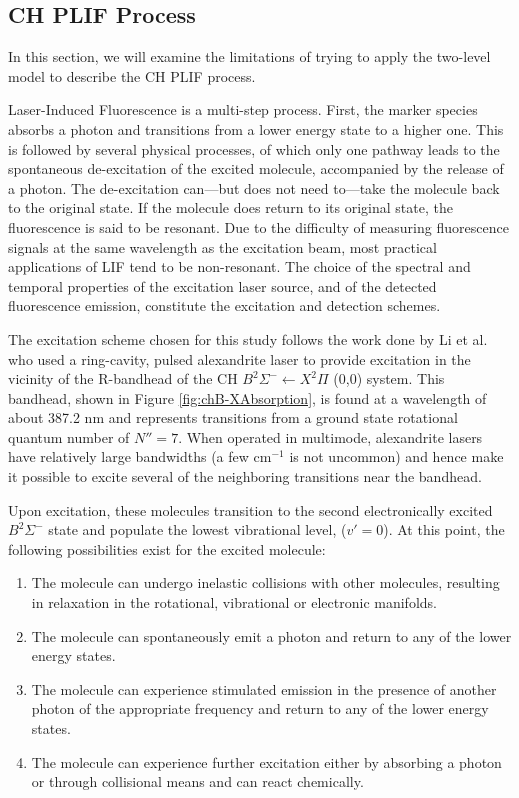 \subsection{CH PLIF Process}
\label{subsec:background-ch-plif-process}

In this section, we will examine the limitations of trying to apply the two-level model to describe the CH PLIF process.

Laser-Induced Fluorescence is a multi-step process.
First, the marker species absorbs a photon and transitions from a lower energy state to a higher one.
This is followed by several physical processes, of which only one pathway leads to the spontaneous de-excitation of the excited molecule, accompanied by the release of a photon.
The de-excitation can---but does not need to---take the molecule back to the original state.
If the molecule does return to its original state, the fluorescence is said to be resonant.
Due to the difficulty of measuring fluorescence signals at the same wavelength as the excitation beam, most practical applications of LIF tend to be non-resonant.
The choice of the spectral and temporal properties of the excitation laser source, and of the detected fluorescence emission, constitute the excitation and detection schemes.

The excitation scheme chosen for this study follows the work done by Li et al.\cite{2007-li-a} who used a ring-cavity, pulsed alexandrite laser to provide excitation in the vicinity of the R-bandhead of the CH \(B^2\Sigma^- \leftarrow X^2\Pi\) (0,0) system.
This bandhead, shown in Figure \ref{fig:chB-XAbsorption}, is found at a wavelength of about 387.2 nm and represents transitions from a ground state rotational quantum number of \(N''=7\).
When operated in multimode, alexandrite lasers have relatively large bandwidths (a few cm\(^{-1}\) is not uncommon) and hence make it possible to excite several of the neighboring transitions near the bandhead.



Upon excitation, these molecules transition to the second electronically excited \(B^2\Sigma^-\) state and populate the lowest vibrational level, (\(v'=0\)).
At this point, the following possibilities exist for the excited molecule:

\begin{enumerate}
  \item The molecule can undergo inelastic collisions with other molecules, resulting in relaxation in the rotational, vibrational or electronic manifolds.
  \item The molecule can spontaneously emit a photon and return to any of the lower energy states.
  \item The molecule can experience stimulated emission in the presence of another photon of the appropriate frequency and return to any of the lower energy states.
  \item The molecule can experience further excitation either by absorbing a photon or through collisional means and can react chemically.
\end{enumerate}

